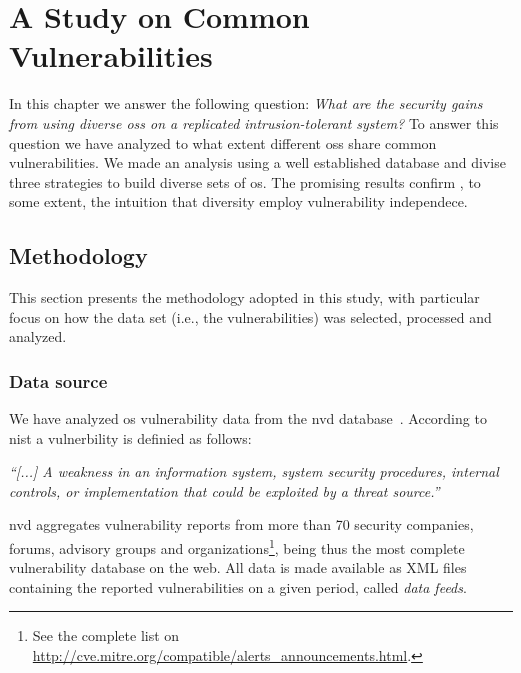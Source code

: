 \chapter{A Study on Common Vulnerabilities}
\label{chap:datasource}

In this chapter we answer the following question: \emph{What are the security gains from using diverse \glspl{os} on a replicated intrusion-tolerant system?}
To answer this question we have analyzed to what extent different \glspl{os} share common vulnerabilities.
We made an analysis using a well established database and divise three strategies to build diverse sets of \gls{os}.
The promising results confirm , to some extent, the intuition that diversity employ vulnerability independece.

\section{Methodology}

This section presents the methodology adopted in this study, with particular focus on how the data set (i.e., the vulnerabilities) was selected, processed and analyzed.

\subsection*{Data source}
We have analyzed \gls{os} vulnerability data from the \gls{nvd} database~\cite{nvd}. 
According to \gls{nist} a vulnerbility is definied as follows:

\begin{defn}
 \emph{``[...] A weakness in an information system, system security procedures, internal controls, or implementation that could be exploited by a threat source.''}~\cite{Nist:2012}
\end{defn}


\gls{nvd} aggregates vulnerability reports from more than 70 security companies, forums, advisory groups and organizations\footnote{See the complete list on \url{http://cve.mitre.org/compatible/alerts_announcements.html}.}, being thus the most complete vulnerability database on the web.
All data is made available as XML files containing the reported vulnerabilities on a given period, called \emph{data feeds}.



